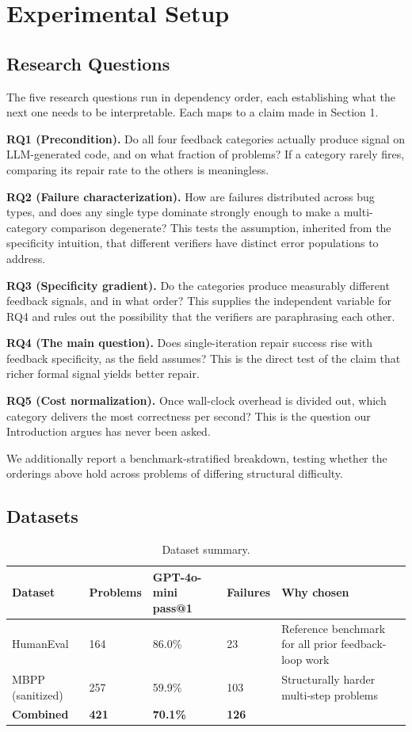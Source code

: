 \section{Experimental Setup}

\subsection{Research Questions}

The five research questions run in dependency order, each establishing what the next one needs to be interpretable. Each maps to a claim made in Section 1.

\textbf{RQ1 (Precondition).} Do all four feedback categories actually produce signal on LLM-generated code, and on what fraction of problems? If a category rarely fires, comparing its repair rate to the others is meaningless.

\textbf{RQ2 (Failure characterization).} How are failures distributed across bug types, and does any single type dominate strongly enough to make a multi-category comparison degenerate? This tests the assumption, inherited from the specificity intuition, that different verifiers have distinct error populations to address.

\textbf{RQ3 (Specificity gradient).} Do the categories produce measurably different feedback signals, and in what order? This supplies the independent variable for RQ4 and rules out the possibility that the verifiers are paraphrasing each other.

\textbf{RQ4 (The main question).} Does single-iteration repair success rise with feedback specificity, as the field assumes? This is the direct test of the claim that richer formal signal yields better repair.

\textbf{RQ5 (Cost normalization).} Once wall-clock overhead is divided out, which category delivers the most correctness per second? This is the question our Introduction argues has never been asked.

We additionally report a benchmark-stratified breakdown, testing whether the orderings above hold across problems of differing structural difficulty.

\subsection{Datasets}

\begin{table}[h]
\centering
\caption{Dataset summary.}
\label{tab:datasets}
\begin{tabular}{lllll}
\toprule
Dataset & Problems & GPT-4o-mini pass@1 & Failures & Why chosen \\
\midrule
HumanEval & 164 & 86.0\% & 23 & Reference benchmark for all prior feedback-loop work \\
MBPP (sanitized) & 257 & 59.9\% & 103 & Structurally harder multi-step problems \\
\textbf{Combined} & \textbf{421} & \textbf{70.1\%} & \textbf{126} & \\
\bottomrule
\end{tabular}
\end{table}

